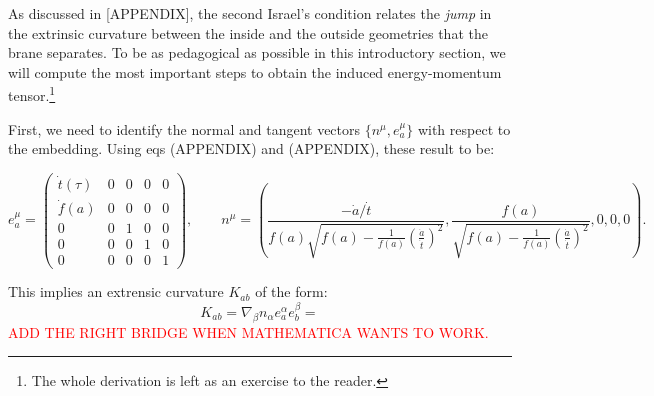 \documentclass[12pt, a4paper]{article} %
\begin{document}
As discussed in [APPENDIX], the second Israel's condition relates the \textit{jump} in the extrinsic curvature between the inside and the outside geometries that the brane separates. To be as pedagogical as possible in this introductory section, we will compute the most important steps to obtain the induced energy-momentum tensor.\footnote{The whole derivation is left as an exercise to the reader.}

First, we need to identify the normal and tangent vectors $\{n^{\mu}, e^{\mu}_{a}\}$ with respect to the embedding. Using eqs (APPENDIX) and (APPENDIX),  these result to be:
\begin{small}
\begin{equation}
	e^{\mu}_{a} = \begin{pmatrix} \dot{t}(\tau) &0&0&0&0\\\dot{f}(a)&0&0&0&0\\0&0&1&0&0\\0&0&0&1&0\\0&0&0&0&1 \end{pmatrix}, \qquad n^{\mu} = \left(\frac{-\dot{a}/\dot{t}}{f(a)\sqrt{f(a) - \tfrac{1}{f(a)} \left(\tfrac{\dot{a}}{\dot{t}}\right)^{2}}}, \frac{f(a)}{\sqrt{f(a) - \tfrac{1}{f(a)} \left(\tfrac{\dot{a}}{\dot{t}}\right)^{2}}}, 0,0,0 \right).
\end{equation}
\end{small}
This implies an extrensic curvature $K_{ab}$ of the form:
\begin{equation}
	K_{ab} = \nabla_{\beta} n_{\alpha} e^{\alpha}_{a} e^{\beta}_{b} = 
\end{equation}
\textcolor{red}{ADD THE RIGHT BRIDGE WHEN MATHEMATICA WANTS TO WORK.}
\end{document}
